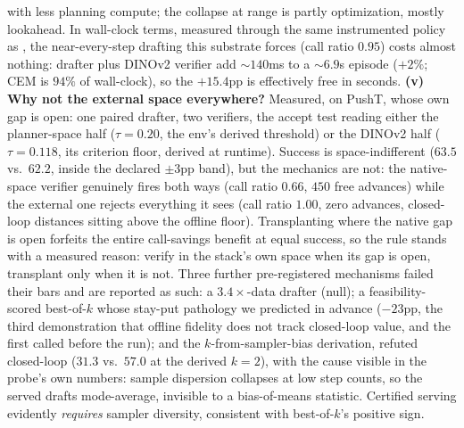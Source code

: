 \documentclass{article}
\begin{document}
with less planning compute; the collapse at range is partly optimization,
mostly lookahead. In wall-clock terms, measured through the same instrumented
policy as , the near-every-step drafting this substrate forces
(call ratio $0.95$) costs almost nothing: drafter plus DINOv2 verifier add
${\sim}140$ms to a ${\sim}6.9$s episode ($+2\%$; CEM is $94\%$ of wall-clock),
so the $+15.4$pp is effectively free in seconds.
\textbf{(v) Why not the external space everywhere?} Measured, on PushT, whose own
gap is open: one paired drafter, two verifiers, the accept test reading either the
planner-space half ($\tau{=}0.20$, the env's derived threshold) or the DINOv2 half
($\tau{=}0.118$, its criterion floor, derived at runtime). Success is
space-indifferent ($63.5$ vs.\ $62.2$, inside the declared $\pm3$pp band), but the
mechanics are not: the native-space verifier genuinely fires both ways (call ratio
$0.66$, $450$ free advances) while the external one rejects everything it sees
(call ratio $1.00$, zero advances, closed-loop distances sitting above the offline
floor). Transplanting where the native gap is open forfeits the entire call-savings
benefit at equal success, so the rule stands with a measured reason: verify in the
stack's own space when its gap is open, transplant only when it is not.
Three further pre-registered mechanisms failed their bars and are reported as
such: a $3.4\times$-data drafter (null); a feasibility-scored best-of-$k$ whose
stay-put pathology we predicted in advance ($-23$pp, the third demonstration
that offline fidelity does not track closed-loop value, and the first called
before the run); and the $k$-from-sampler-bias derivation, refuted closed-loop
($31.3$ vs.\ $57.0$ at the derived $k{=}2$), with the cause visible in the
probe's own numbers: sample dispersion collapses at low step counts, so the
served drafts mode-average, invisible to a bias-of-means statistic. Certified
serving evidently \emph{requires} sampler diversity, consistent with
best-of-$k$'s positive sign.


\end{document}
